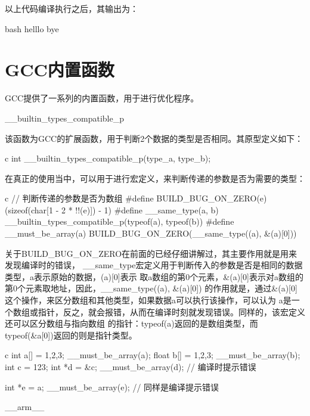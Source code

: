以上代码编译执行之后，其输出为：
\begin{code-block}{bash}
helllo
bye
\end{code-block}

\section{GCC内置函数}
GCC提供了一系列的内置函数，用于进行优化程序。

\begin{outline}[enumerate]

\1 \_\_builtin\_types\_compatible\_p

该函数为GCC的扩展函数，用于判断2个数据的类型是否相同。其原型定义如下：
\begin{code-in-enumerate}{c}
  int __builtin_types_compatible_p(type_a, type_b);
\end{code-in-enumerate}

在真正的使用当中，可以用于进行宏定义，来判断传递的参数是否为需要的类型：
\begin{code-in-enumerate}{c}
// 判断传递的参数是否为数组
#define BUILD_BUG_ON_ZERO(e) (sizeof(char[1 - 2 * !!(e)]) - 1)
#define __same_type(a, b) __builtin_types_compatible_p(typeof(a), typeof(b))
#define __must_be_array(a) BUILD_BUG_ON_ZERO(__same_type((a), &(a)[0]))
\end{code-in-enumerate}

关于BUILD\_BUG\_ON\_ZERO在前面的已经仔细讲解过，其主要作用就是用来发现编译时的错误，
\_\_same\_type宏定义用于判断传入的参数是否是相同的数据类型，a表示原始的数据，(a)[0]表示
取a数组的第0个元素，\&(a)[0]表示对a数组的第0个元素取地址，因此，\_\_same\_type((a), \&(a)[0])
的作用就是，通过\&(a)[0]这个操作，来区分数组和其他类型，如果数据a可以执行该操作，可以认为
a是一个数组或指针，反之，就会报错，从而在编译时刻就发现错误。同样的，该宏定义还可以区分数组与指向数组
的指针：typeof(a)返回的是数组类型，而typeof(\&a[0])返回的则是指针类型。

\begin{code-in-enumerate}{c}
int a[] = {1,2,3};
__must_be_array(a);
float b[] = {1,2,3};
__must_be_array(b);
int c = 123;
int *d = &c;
__must_be_array(d); // 编译时提示错误

int *e = a;
__must_be_array(e); // 同样是编译提示错误
\end{code-in-enumerate}

\1 \_\_arm\_\_


\end{outline}

